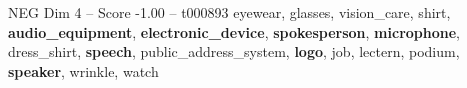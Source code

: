 \begin{textsample}{NEG Dim 4 – Score -1.00 – t000893}  \label{ex:f4_neg_006}
eyewear, glasses, vision\_care, shirt, \textbf{audio\_equipment}, \textbf{electronic\_device}, \textbf{spokesperson}, \textbf{microphone}, dress\_shirt, \textbf{speech}, public\_address\_system, \textbf{logo}, job, lectern, podium, \textbf{speaker}, wrinkle, watch

\end{textsample}
